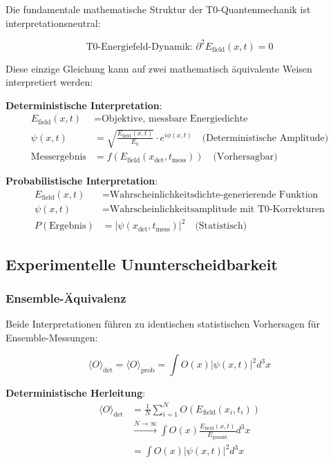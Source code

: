\documentclass[12pt,a4paper]{article}
\theoremstyle{definition}
\theoremstyle{remark}
\begin{document}
Die fundamentale mathematische Struktur der T0-Quantenmechanik ist interpretationsneutral:

\begin{equation}
	\boxed{\text{T0-Energiefeld-Dynamik: } \partial^2 E_{\text{field}}(x,t) = 0}
	\label{eq:fundamental_dynamics}
\end{equation}

Diese einzige Gleichung kann auf zwei mathematisch äquivalente Weisen interpretiert werden:

\textbf{Deterministische Interpretation}:
\begin{align}
	E_{\text{field}}(x,t) &= \text{Objektive, messbare Energiedichte} \\
	\psi(x,t) &= \sqrt{\frac{E_{\text{field}}(x,t)}{E_0}} \cdot e^{i\phi(x,t)} \quad \text{(Deterministische Amplitude)} \\
	\text{Messergebnis} &= f(E_{\text{field}}(x_{\text{det}}, t_{\text{mess}})) \quad \text{(Vorhersagbar)}
\end{align}

\textbf{Probabilistische Interpretation}:
\begin{align}
	E_{\text{field}}(x,t) &= \text{Wahrscheinlichkeitsdichte-generierende Funktion} \\
	\psi(x,t) &= \text{Wahrscheinlichkeitsamplitude mit T0-Korrekturen} \\
	P(\text{Ergebnis}) &= |\psi(x_{\text{det}}, t_{\text{mess}})|^2 \quad \text{(Statistisch)}
\end{align}

\subsection{Experimentelle Ununterscheidbarkeit}

\subsubsection{Ensemble-Äquivalenz}

Beide Interpretationen führen zu identischen statistischen Vorhersagen für Ensemble-Messungen:

\begin{equation}
	\boxed{\langle O \rangle_{\text{det}} = \langle O \rangle_{\text{prob}} = \int O(x) |\psi(x,t)|^2 d^3x}
	\label{eq:ensemble_equivalence}
\end{equation}

\textbf{Deterministische Herleitung}:
\begin{align}
	\langle O \rangle_{\text{det}} &= \frac{1}{N} \sum_{i=1}^N O(E_{\text{field}}(x_i, t_i)) \\
	&\xrightarrow{N \to \infty} \int O(x) \frac{E_{\text{field}}(x,t)}{E_{\text{gesamt}}} d^3x \\
	&= \int O(x) |\psi(x,t)|^2 d^3x
\end{align}
\end{document}
